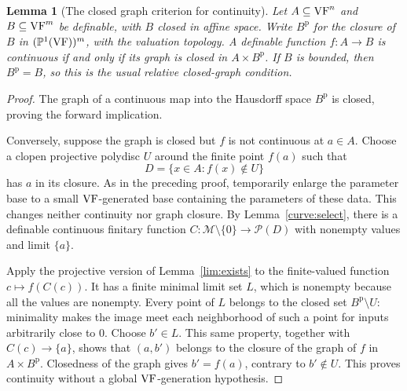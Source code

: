 \documentclass[12pt]{amsart}
\theoremstyle{plain}
\newtheorem{lem}[thm]{Lemma}
\theoremstyle{definition}
\theoremstyle{remark}
\numberwithin{equation}{section}
\theoremstyle{plain}
\newcommand{\VF}{\textup{VF}}
\newcommand{\MM}{\mdl M}
\newcommand{\0}{\emptyset}
\newcommand{\mdl}[1]{\mathcal{#1}}  %
\newcommand{\fun}{\longrightarrow}
\newcommand{\efun}{\longmapsto}
\begin{document}
\begin{lem}[The closed graph criterion for continuity]\label{closed:gra}
Let $A\subseteq\VF^n$ and $B\subseteq\VF^m$ be definable, with $B$ closed in affine space. Write $B^{\mathrm p}$ for the closure of $B$ in $(\mathbb P^1(\VF))^m$, with the valuation topology. A definable function $f:A\fun B$ is continuous if and only if its graph is closed in $A\times B^{\mathrm p}$. If $B$ is bounded, then $B^{\mathrm p}=B$, so this is the usual relative closed-graph condition.
\end{lem}
\begin{proof}
The graph of a continuous map into the Hausdorff space $B^{\mathrm p}$ is closed, proving the forward implication.

Conversely, suppose the graph is closed but $f$ is not continuous at $a\in A$. Choose a clopen projective polydisc $U$ around the finite point $f(a)$ such that
\[
D=\{x\in A:f(x)\notin U\}
\]
has $a$ in its closure. As in the preceding proof, temporarily enlarge the parameter base to a small $\VF$-generated base containing the parameters of these data. This changes neither continuity nor graph closure. By Lemma~\ref{curve:select}, there is a definable continuous finitary function $C:\MM\setminus\{0\}\fun\mdl P(D)$ with nonempty values and limit $\{a\}$.

Apply the projective version of Lemma~\ref{lim:exists} to the finite-valued function $c\efun f(C(c))$. It has a finite minimal limit set $L$, which is nonempty because all the values are nonempty. Every point of $L$ belongs to the closed set $B^{\mathrm p}\setminus U$: minimality makes the image meet each neighborhood of such a point for inputs arbitrarily close to $0$. Choose $b'\in L$. This same property, together with $C(c)\to\{a\}$, shows that $(a,b')$ belongs to the closure of the graph of $f$ in $A\times B^{\mathrm p}$. Closedness of the graph gives $b'=f(a)$, contrary to $b'\notin U$. This proves continuity without a global $\VF$-generation hypothesis.
\end{proof}
\end{document}
